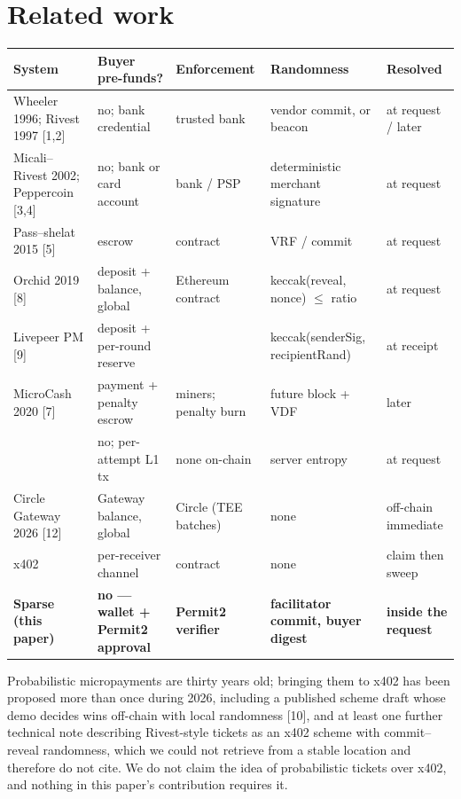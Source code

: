 \documentclass[11pt,a4paper]{article}
\renewcommand{\arraystretch}{1.15}
\newcommand{\code}[1]{\texttt{\seqbreak{#1}}}
\newcommand{\seqbreak}[1]{\begingroup\lccode`~=`/ \lowercase{\def~{/\allowbreak}}%
  \lccode`~=`. \lowercase{\def~{.\allowbreak}}%
  \lccode`~=`- \lowercase{\def~{-\allowbreak}}%
  \lccode`~=`_ \lowercase{\def~{\textunderscore\allowbreak}}%
  \catcode`/=13 \catcode`.=13 \catcode`-=13 \catcode`_=13 \scantokens{#1\noexpand}\endgroup}
\begin{document}
\section{Related work}

\begin{center}\footnotesize
\renewcommand{\arraystretch}{1.25}\begin{tabular}{@{}>{\raggedright\arraybackslash}p{3.1cm}>{\raggedright\arraybackslash}p{3.2cm}>{\raggedright\arraybackslash}p{2.5cm}>{\raggedright\arraybackslash}p{3.1cm}>{\raggedright\arraybackslash}p{2.2cm}@{}}
\toprule
System & Buyer pre-funds? & Enforcement & Randomness & Resolved \\
\midrule
Wheeler 1996; Rivest 1997 [1,2] & no; bank credential & trusted bank & vendor commit, or beacon & at request / later \\
Micali--Rivest 2002; Peppercoin [3,4] & no; bank or card account & bank / PSP & deterministic merchant signature & at request \\
Pass--shelat 2015 [5] & escrow & contract & VRF / commit & at request \\
Orchid 2019 [8] & deposit + balance, global & Ethereum contract & keccak(reveal, nonce) $\le$ ratio & at request \\
Livepeer PM [9] & deposit + per-round reserve & \code{TicketBroker} & keccak(senderSig, recipientRand) & at receipt \\
MicroCash 2020 [7] & payment + penalty escrow & miners; penalty burn & future block + VDF & later \\
\code{emc-randpay-x402} 2026 [10] & no; per-attempt L1 tx & none on-chain & server entropy & at request \\
Circle Gateway 2026 [12] & Gateway balance, global & Circle (TEE batches) & none & off-chain immediate \\
x402 \code{batch-settlement} [11] & per-receiver channel & contract & none & claim then sweep \\
\textbf{Sparse (this paper)} & \textbf{no --- wallet + Permit2 approval} & \textbf{Permit2 verifier} & \textbf{facilitator commit, buyer digest} & \textbf{inside the request} \\
\bottomrule
\end{tabular}
\end{center}

Probabilistic micropayments are thirty years old; bringing them to x402 has been proposed more than once during
2026, including a published scheme draft whose demo decides wins off-chain with local randomness [10], and at
least one further technical note describing Rivest-style tickets as an x402 scheme with commit--reveal
randomness, which we could not retrieve from a stable location and therefore do not cite. We do not claim the
idea of probabilistic tickets over x402, and nothing in this paper's contribution requires it.
\end{document}
